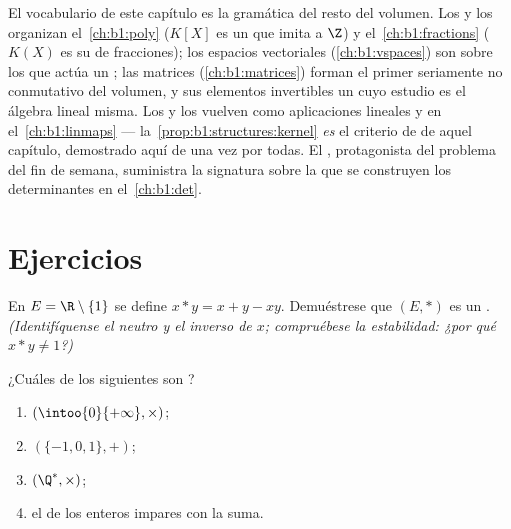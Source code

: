 \begin{remark}\label{rem:b1:structures:whereused}
El vocabulario de este capítulo es la gramática del resto del volumen.
Los  y los  organizan el~\cref{ch:b1:poly} ($K[X]$ es
un  que imita a $\Z$) y el~\cref{ch:b1:fractions} ($K(X)$ es su
 de fracciones); los espacios vectoriales
(\cref{ch:b1:vspaces}) son  sobre los que actúa un
; las matrices (\cref{ch:b1:matrices}) forman el primer
 seriamente no conmutativo del volumen, y sus elementos
invertibles un  cuyo estudio es el álgebra lineal misma. Los
 y los  vuelven como aplicaciones lineales y
 en el~\cref{ch:b1:linmaps} --- la~\cref{prop:b1:structures:kernel}
\emph{es} el criterio de  de aquel capítulo, demostrado
aquí de una vez por todas. El , protagonista del
problema del fin de semana, suministra la signatura sobre la que se
construyen los determinantes en el~\cref{ch:b1:det}.
\end{remark}

\section{Ejercicios}

\begin{exercise}[$\star$]\label{exo:b1:structures:1}
En $E = \R \setminus \{1\}$ se define $x * y = x + y - xy$. Demuéstrese
que $(E, *)$ es un . \emph{(Identifíquense el neutro y el
inverso de $x$; compruébese la estabilidad: ¿por qué $x * y \neq 1$?)}
\end{exercise}

\begin{exercise}[$\star$]\label{exo:b1:structures:2}
¿Cuáles de los siguientes son ?
\begin{enumerate}
  \item $(\intoo{0}{+\infty}, \times)$;
  \item $(\{-1, 0, 1\}, +)$;
  \item $(\Q^*, \times)$;
  \item el  de los enteros impares con la suma.
\end{enumerate}
\end{exercise}

